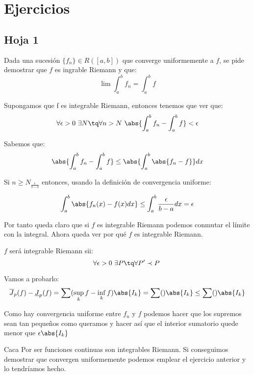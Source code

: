 \section{Ejercicios}
\subsection{Hoja 1}
\begin{problem}[Ejercicio 5]
Dada una sucesión $\lbrace f_n \rbrace \in R([a,b])$ que converge uniformemente a $f$, se pide demostrar que $f$ es ingrable Riemann y que:
\[\lim \int_a^b f_n = \int_a^b f\]

\solution
Supongamos que f es integrable Riemann, entonces tenemos que ver que:
\[ \forall \epsilon > 0 \  \exists N \tq \forall n> N \ \abs{\int_a^b f_n - \int_a^b f} < \epsilon\]

Sabemos que:
\[\abs{\int_a^b f_n - \int_a^b f} \leq \abs{\int_a^b \abs{f_n -f}} dx\]

Si $n \geq N_{\frac{\epsilon}{b-a}}$ entonces, usando la definición de convergencia uniforme:

\[\int_a^b \abs{f_n(x) - f(x) dx} \leq \int_a^b \frac{\epsilon}{b-a}dx = \epsilon\]

Por tanto queda claro que si $f$ es integrable Riemann podemos conmutar el límite con la integral. Ahora queda ver por qué $f$ es integrable Riemann.

$f$ será integrable Riemann sii:
\[\forall \epsilon > 0 \ \exists P \tq \forall P' \prec P \ \]

Vamos a probarlo:
\[\overline{J}_p(f) - \underline{J}_p(f) = \sum(\sup_k f - \inf_k f)\abs{I_k} = \sum()\abs{I_k} \leq \sum ()\abs{I_k}\]

Como hay convergencia uniforme entre $f_n$ y $f$ podemos hacer que los supremos sean tan pequeños como queramos y hacer así que el interior sumatorio quede menor que $\epsilon \abs{I_k}$

\end{problem}

\begin{problem}[Ejercicio 6]

Caca 
\solution
Por ser funciones continuas son integrables Riemann. Si conseguimos demostrar que convergen uniformemente podemos emplear el ejercicio anterior y lo tendríamos hecho.
\end{problem}

